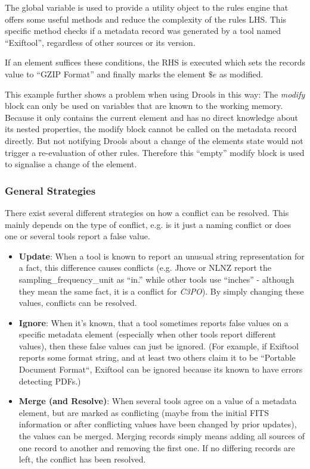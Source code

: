 \documentclass[a4paper,12pt]{article}
\begin{document}
The global variable is used to provide a utility object to the rules engine that offers some useful methods and reduce the complexity of the rules LHS. This specific method checks if a metadata record was generated by a tool named ``Exiftool'', regardless of other sources or its version.

If an element suffices these conditions, the RHS is executed which sets the records value to ``GZIP Format'' and finally marks the element $\$e$ as modified. 

This example further shows a problem when using Drools in this way: The \emph{modify} block can only be used on variables that are known to the working memory. Because it only contains the current element and has no direct knowledge about its nested properties, the modify block cannot be called on the metadata record directly. But not notifying Drools about a change of the elements state would not trigger a re-evaluation of other rules. Therefore this ``empty'' modify block is used to signalise a change of the element.

\subsubsection{General Strategies}

There exist several different strategies on how a conflict can be resolved. This mainly depends on the type of conflict, e.g. is it just a naming conflict or does one or several tools report a false value.

\begin{itemize}
\item \textbf{Update}: When a tool is known to report an unusual string representation for a fact, this difference causes conflicts (e.g. Jhove or NLNZ report the sampling\_frequency\_unit as ``in.'' while other tools use ``inches'' - although they mean the same fact, it is a conflict for \emph{C3PO}). By simply changing these values, conflicts can be resolved.
\item \textbf{Ignore}: When it's known, that a tool sometimes reports false values on a specific metadata element (especially when other tools report different values), then these false values can just be ignored. (For example, if Exiftool reports some format string, and at least two others claim it to be ``Portable Document Format``, Exiftool can be ignored because its known to have errors detecting PDFs.)
\item \textbf{Merge (and Resolve)}: When several tools agree on a value of a metadata element, but are marked as conflicting (maybe from the initial FITS information or after conflicting values have been changed by prior updates), the values can be merged. Merging records simply means adding all sources of one record to another and removing the first one. If no differing records are left, the conflict has been resolved.

\end{itemize}
\end{document}
